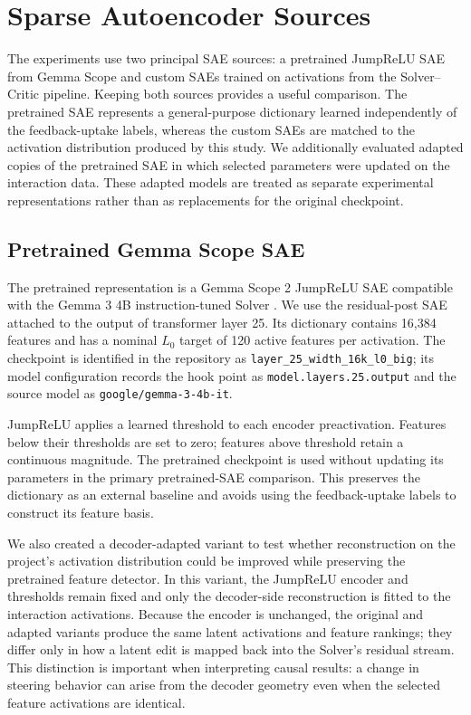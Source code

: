\section{Sparse Autoencoder Sources}

The experiments use two principal SAE sources: a pretrained JumpReLU SAE from
Gemma Scope and custom SAEs trained on activations from the Solver--Critic
pipeline. Keeping both sources provides a useful comparison. The pretrained
SAE represents a general-purpose dictionary learned independently of the
feedback-uptake labels, whereas the custom SAEs are matched to the activation
distribution produced by this study. We additionally evaluated adapted copies
of the pretrained SAE in which selected parameters were updated on the
interaction data. These adapted models are treated as separate experimental
representations rather than as replacements for the original checkpoint.

\subsection{Pretrained Gemma Scope SAE}

The pretrained representation is a Gemma Scope 2 JumpReLU SAE compatible with
the Gemma 3 4B instruction-tuned Solver \cite{lieberum2024gemmascope}. We use
the residual-post SAE attached to the output of transformer layer 25. Its
dictionary contains 16,384 features and has a nominal $L_0$ target of 120
active features per activation. The checkpoint is identified in the repository
as \texttt{layer\_25\_width\_16k\_l0\_big}; its model configuration records
the hook point as \texttt{model.layers.25.output} and the source model as
\texttt{google/gemma-3-4b-it}.

JumpReLU applies a learned threshold to each encoder preactivation. Features
below their thresholds are set to zero; features above threshold retain a
continuous magnitude. The pretrained checkpoint is used without updating its
parameters in the primary pretrained-SAE comparison. This preserves the
dictionary as an external baseline and avoids using the feedback-uptake labels
to construct its feature basis.

We also created a decoder-adapted variant to test whether reconstruction on the
project's activation distribution could be improved while preserving the
pretrained feature detector. In this variant, the JumpReLU encoder and
thresholds remain fixed and only the decoder-side reconstruction is fitted to
the interaction activations. Because the encoder is unchanged, the original
and adapted variants produce the same latent activations and feature rankings;
they differ only in how a latent edit is mapped back into the Solver's residual
stream. This distinction is important when interpreting causal results: a
change in steering behavior can arise from the decoder geometry even when the
selected feature activations are identical.

